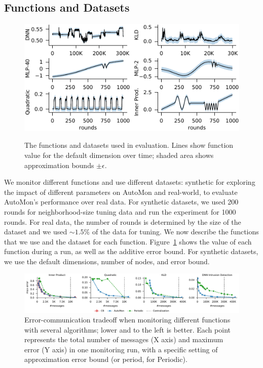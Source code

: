 \subsection{Functions and Datasets} 
\label{sub_sec:functions_and_datasets}

\begin{figure}
	\centering
	{\label{sub_fig:function_values_and_error_bound_around_it}
	\includegraphics[width=1.0\columnwidth]{figures/function_values_and_error_bound_around_it.pdf}}
	\caption{
	    The functions and datasets used in evaluation.
	    Lines show function value for the default dimension over time;
		shaded area shows approximation bounds $\pm \epsilon$.
	}
	\label{fig:function_value_and_error_bound_around_it}
\end{figure}

We monitor different functions and use different datasets: synthetic for exploring the impact of different parameters on AutoMon and real-world, to evaluate AutoMon's performance over real data.
For synthetic datasets, we used 200 rounds for neighborhood-size tuning data and run the experiment for 1000 rounds.
For real data, the number of rounds is determined by the size of the dataset and we used $\sim 1.5\%$ of the data for tuning.
We now describe the functions that we use and the dataset for each function.
Figure~\ref{fig:function_value_and_error_bound_around_it} shows the value of each function during a run, as well as the additive error bound.
For synthetic datasets, we use the default dimensions, number of nodes, and error bound.

\begin{figure}
	\centering
	\includegraphics[width=\textwidth]{figures/max_error_vs_communication.pdf}
	\caption{
		Error-communication tradeoff when monitoring different functions with several algorithms;
		lower and to the left is better.
		Each point represents the total number of messages (X axis) and maximum error (Y axis) in one monitoring run, with a specific setting of approximation error bound (or period, for Periodic).
	}
	\label{fig:error_communication_tradeoff}
\end{figure}

